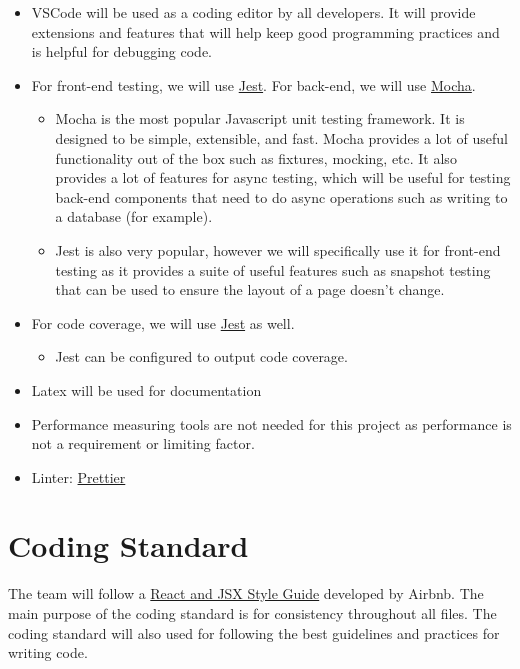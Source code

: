 \documentclass{article}
\begin{document}
\begin{itemize}
\item VSCode will be used as a coding editor by all developers. It will provide extensions and features that will help keep good programming practices and is helpful for debugging code.
\item For front-end testing, we will use \href{https://jestjs.io/}{Jest}. For back-end, we will use \href{https://mochajs.org/}{Mocha}.
\begin{itemize}
    \item Mocha is the most popular Javascript unit testing framework. It is designed to be simple, extensible, and fast. Mocha provides a lot of useful functionality out of the box such as fixtures, mocking, etc. It also provides a lot of features for async testing, which will be useful for testing back-end components that need to do async operations such as writing to a database (for example). 
    
    \item Jest is also very popular, however we will specifically use it for front-end testing as it provides a suite of useful features such as snapshot testing that can be used to ensure the layout of a page doesn't change.
\end{itemize}

\item For code coverage, we will use \href{https://jestjs.io/}{Jest} as well.
\begin{itemize}
    \item Jest can be configured to output code coverage. 
\end{itemize}

\item Latex will be used for documentation

\item Performance measuring tools are not needed for this project as performance is not a requirement or limiting factor.
\item Linter: \href{https://prettier.io/}{Prettier}
\end{itemize}

\section{Coding Standard}
The team will follow a \href{https://airbnb.io/javascript/react/}{React and JSX Style Guide} developed by Airbnb. The main purpose of the coding standard is for consistency throughout all files. The coding standard will also used for following the best guidelines and practices for writing code.
\end{document}
